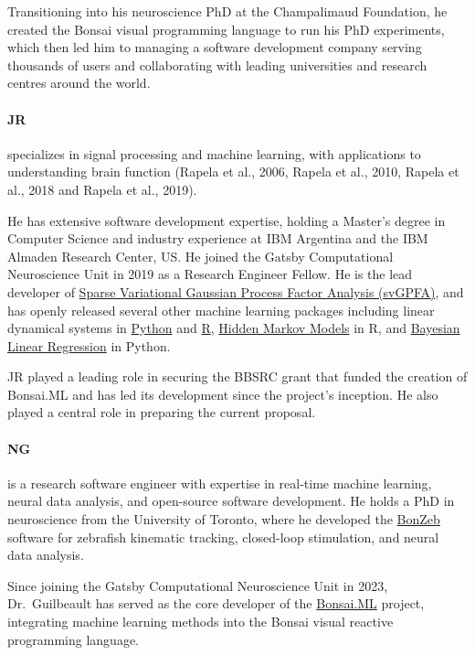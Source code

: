 Transitioning into his neuroscience PhD at the Champalimaud Foundation, he
created the Bonsai visual programming language to run his PhD experiments,
which then led him to managing a software development company serving thousands
of users and collaborating with leading universities and research centres
around the world.

\paragraph{JR} specializes in
signal processing and machine learning, with applications to understanding
brain function (Rapela et al., 2006, Rapela et al., 2010, Rapela et al., 2018
and Rapela et al., 2019).

He has extensive software development expertise, holding a Master’s degree in
Computer Science and industry experience at IBM Argentina and the IBM Almaden
Research Center, US.
%
He joined the Gatsby Computational Neuroscience Unit in 2019 as a Research
Engineer Fellow.
%
He is the lead developer of \href{https://github.com/joacorapela/svGPFA}{Sparse
Variational Gaussian Process Factor Analysis (svGPFA)}, and has openly released
several other machine learning packages including linear dynamical systems in
\href{https://github.com/joacorapela/ssm}{Python} and
\href{https://github.com/joacorapela/kalmanFilter}{R},
\href{https://github.com/joacorapela/hiddenMarkovModels}{Hidden Markov Models}
in R, and
\href{https://github.com/joacorapela/bayesianLinearRegression}{Bayesian Linear
Regression} in Python.

JR played a leading role in securing the BBSRC grant that funded the
creation of Bonsai.ML and has led its development since the project’s
inception. He also played a central role in preparing the current proposal.

\paragraph{NG} is a research software engineer with expertise in real-time
machine learning, neural data analysis, and open-source software development.
He holds a PhD in neuroscience from the University of Toronto, where he
developed the \href{https://ncguilbeault.github.io/BonZeb/}{BonZeb} software
for zebrafish kinematic tracking, closed-loop stimulation, and neural data
analysis.

Since joining the Gatsby Computational Neuroscience Unit in 2023,
Dr.~Guilbeault has served as the core developer of the
\href{https://bonsai-rx.org/machinelearning}{Bonsai.ML} project, integrating
machine learning methods into the Bonsai visual reactive programming language.

